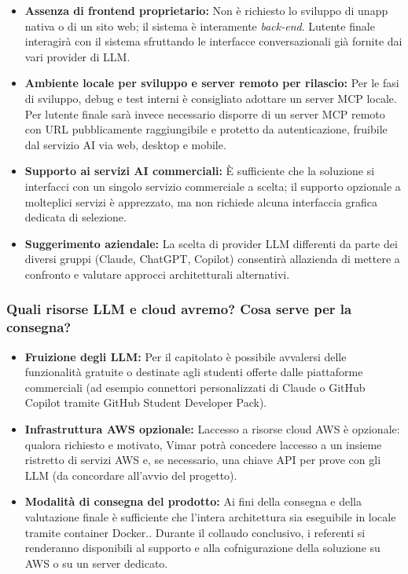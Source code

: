 \documentclass[12pt,a4paper]{article}
\newcommand{\tightlist}{\setlength{\itemsep}{1pt}\setlength{\parskip}{0pt}}
\begin{document}
\begin{itemize}
\tightlist
\item \textbf{Assenza di frontend proprietario:} Non è richiesto lo sviluppo di un\textquotesingle app nativa o di un sito web; il sistema è interamente \emph{back-end}. L\textquotesingle utente finale interagirà con il sistema sfruttando le interfacce conversazionali già fornite dai vari provider di LLM.
\item \textbf{Ambiente locale per sviluppo e server remoto per rilascio:} Per le fasi di sviluppo, debug e test interni è consigliato adottare un server MCP locale. Per l\textquotesingle utente finale sarà invece necessario disporre di un server MCP remoto con URL pubblicamente raggiungibile e protetto da autenticazione, fruibile dal servizio AI via web, desktop e mobile.
\item \textbf{Supporto ai servizi AI commerciali:} È sufficiente che la soluzione si interfacci con un singolo servizio commerciale a scelta; il supporto opzionale a molteplici servizi è apprezzato, ma non richiede alcuna interfaccia grafica dedicata di selezione.
\item \textbf{Suggerimento aziendale:} La scelta di provider LLM differenti da parte dei diversi gruppi (Claude, ChatGPT, Copilot) consentirà all\textquotesingle azienda di mettere a confronto e valutare approcci architetturali alternativi.
\end{itemize}

\hypertarget{quali-risorse-llm-e-cloud-avremo-cosa-serve-per-la-consegna}{%
\subsubsection{\texorpdfstring{Quali risorse LLM e cloud avremo? Cosa serve per la consegna?}{Quali risorse LLM e cloud avremo? Cosa serve per la consegna?}}}

\begin{itemize}
\tightlist
\item \textbf{Fruizione degli LLM:} Per il capitolato è possibile avvalersi delle funzionalità gratuite o destinate agli studenti offerte dalle piattaforme commerciali (ad esempio connettori personalizzati di Claude o GitHub Copilot tramite GitHub Student Developer Pack).
\item \textbf{Infrastruttura AWS opzionale:} L\textquotesingle accesso a risorse cloud AWS è opzionale: qualora richiesto e motivato, Vimar potrà concedere l\textquotesingle accesso a un insieme ristretto di servizi AWS e, se necessario, una chiave API per prove con gli LLM (da concordare all'avvio del progetto).
\item \textbf{Modalità di consegna del prodotto:} Ai fini della consegna e della valutazione finale è sufficiente che l'intera architettura sia eseguibile in locale tramite container Docker.. Durante il collaudo conclusivo, i referenti si renderanno disponibili al supporto e alla cofnigurazione della soluzione su AWS o su un server dedicato.
\end{itemize}
\end{document}
